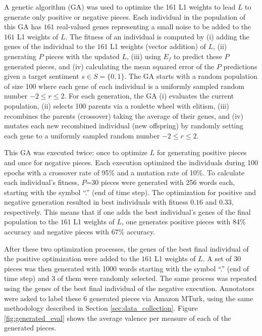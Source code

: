 A genetic algorithm (GA) was used to optimize the 161 L1 weights to lead $L$ to generate only positive or negative pieces. Each individual in the population of this GA has $161$ real-valued genes representing a small noise to be added to the $161$ L1 weights of $L$. The fitness of an individual is computed by (i) adding the genes of the individual to the $161$ L1 weights (vector addition) of $L$, (ii) generating $P$ pieces with the updated $L$, (iii) using $E_f$ to predict these $P$ generated pieces, and (iv) calculating the mean squared error of the $P$ predictions given a target sentiment $s \in S = \{0, 1\}$. The GA starts with a random population of size 100 where each gene of each individual is a uniformly sampled random number $-2 \leq r \leq 2$. For each generation, the GA (i) evaluates the current population, (ii) selects 100 parents via a roulette wheel with elitism, (iii) recombines the parents (crossover) taking the average of their genes, and (iv) mutates each new recombined individual (new offspring) by randomly setting each gene to a uniformly sampled random number $-2 \leq r \leq 2$.

This GA was executed twice: once to optimize $L$ for generating positive pieces and once for negative pieces. Each execution optimized the individuals during 100 epochs with a crossover rate of 95\% and a mutation rate of 10\%. To calculate each individual's fitness, $P$=30 pieces were generated with 256 words each, starting with the symbol ``.'' (end of time step). The optimization for positive and negative generation resulted in best individuals with fitness $0.16$ and $0.33$, respectively. This means that if one adds the best individual's genes of the final population to the $161$ L1 weights of $L$, one generates positive pieces with 84\% accuracy and negative pieces with 67\% accuracy.

After these two optimization processes, the genes of the best final individual of the positive optimization were added to the $161$ L1 weights of $L$. A set of 30 pieces was then generated with 1000 words starting with the symbol ``.'' (end of time step) and 3 of them were randomly selected. The same process was repeated using the genes of the best final individual of the negative execution. Annotators were asked to label these 6 generated pieces via Amazon MTurk, using the same methodology described in Section \ref{sec:data_collection}. Figure \ref{fig:generated_eval} shows the average valence per measure of each of the generated pieces.

